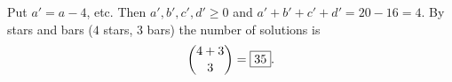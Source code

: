 Put $a'=a-4$, etc. Then $a',b',c',d'\ge0$ and $a'+b'+c'+d'=20-16=4$. By stars and bars ($4$ stars, $3$ bars) the number of solutions is
\[
\dbinom{4+3}{3}=\boxed{35}.
\]
